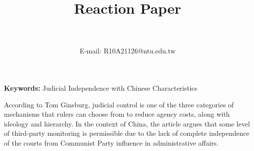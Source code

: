 \documentclass[]{article}
\begin{document}
\title{Reaction Paper}
\author{\textbf{\fontsize{14pt}{16.4pt}\selectfont{YIFAN WANG}}~\\\normalsize{}~\\{\normalsize\normalfont  E-mail: R10A21126@ntu.edu.tw}}
\def\RunningHead{{Reaction Paper}}

\maketitle 







\def\keywordstitle{Keywords}

\smallskip\noindent\textbf{Keywords: }{Judicial Independence with Chinese Characteristics} 


\setcounter{tocdepth}{1}





According to Tom Ginsburg, judicial control is one of the three categories of mechanisms that rulers can choose from to reduce agency costs, along with ideology and hierarchy. In the context of China, the article argues that some level of third-party monitoring is permissible due to the lack of complete independence of the courts from Communist Party influence in administrative affairs.
\end{document}
